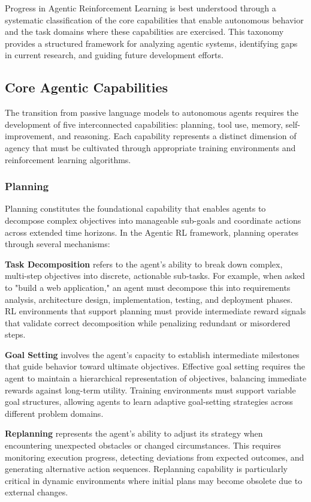 Progress in Agentic Reinforcement Learning is best understood through a systematic classification of the core capabilities that enable autonomous behavior and the task domains where these capabilities are exercised. This taxonomy provides a structured framework for analyzing agentic systems, identifying gaps in current research, and guiding future development efforts.

\subsection{Core Agentic Capabilities}

The transition from passive language models to autonomous agents requires the development of five interconnected capabilities: planning, tool use, memory, self-improvement, and reasoning. Each capability represents a distinct dimension of agency that must be cultivated through appropriate training environments and reinforcement learning algorithms.

\subsubsection{Planning}

Planning constitutes the foundational capability that enables agents to decompose complex objectives into manageable sub-goals and coordinate actions across extended time horizons. In the Agentic RL framework, planning operates through several mechanisms:

\textbf{Task Decomposition} refers to the agent's ability to break down complex, multi-step objectives into discrete, actionable sub-tasks. For example, when asked to "build a web application," an agent must decompose this into requirements analysis, architecture design, implementation, testing, and deployment phases. RL environments that support planning must provide intermediate reward signals that validate correct decomposition while penalizing redundant or misordered steps.

\textbf{Goal Setting} involves the agent's capacity to establish intermediate milestones that guide behavior toward ultimate objectives. Effective goal setting requires the agent to maintain a hierarchical representation of objectives, balancing immediate rewards against long-term utility. Training environments must support variable goal structures, allowing agents to learn adaptive goal-setting strategies across different problem domains.

\textbf{Replanning} represents the agent's ability to adjust its strategy when encountering unexpected obstacles or changed circumstances. This requires monitoring execution progress, detecting deviations from expected outcomes, and generating alternative action sequences. Replanning capability is particularly critical in dynamic environments where initial plans may become obsolete due to external changes.

